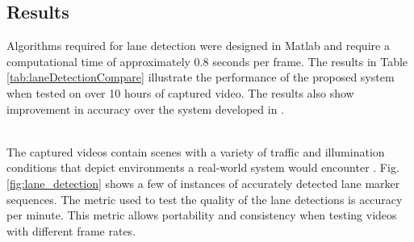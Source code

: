 \documentclass{article}
\begin{document}
\subsection{Results}
Algorithms required for lane detection were designed in Matlab and require a computational time of approximately 0.8 seconds per frame. The results in Table \ref{tab:laneDetectionCompare} illustrate the performance of the proposed system when tested on over 10 hours of captured video. The results also show improvement in accuracy over the system developed in \cite{borkar_layered_2009}.
\begin{table}[htb!]
\caption{Comparing accuracies of lane detection system}
\label{tab:laneDetectionCompare}
\end{table}\\
The captured videos contain scenes with a variety of traffic and illumination conditions that depict environments a real-world system would encounter \cite{borkar_layered_2009}. Fig. \ref{fig:lane_detection} shows a few of instances of accurately detected lane marker sequences. The metric used to test the quality of the lane detections is accuracy per minute. This metric allows portability and consistency when testing videos with different frame rates.
\end{document}
